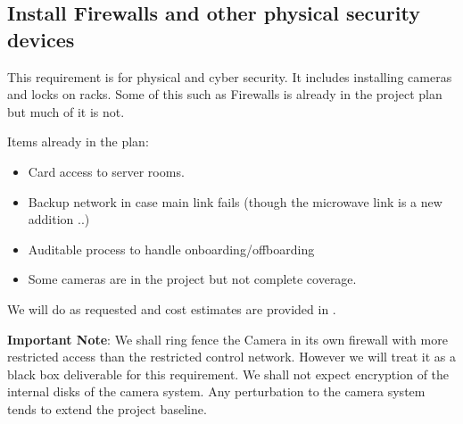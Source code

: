 
\subsection{Install Firewalls and other physical security devices} \label{sec:2firewalls}

This requirement is for physical and cyber security. It includes installing cameras and locks on racks.
Some of this such as Firewalls is already in the project plan but much of it is not.

Items already in the plan:
\begin{itemize}
\item Card access to server rooms.
\item Backup network in case main link fails (though the microwave link is a new addition ..)
\item Auditable process to handle onboarding/offboarding
\item Some cameras are in the project but not complete coverage.

\end{itemize}

We will do as requested and cost estimates are provided in .

{\bf Important Note}: We shall ring fence the Camera in its own firewall with more restricted access than the restricted control network.
However we will treat it as a black box deliverable for this requirement. We shall not expect encryption of the internal disks of the camera system. Any perturbation to the camera system tends to extend the project baseline.



